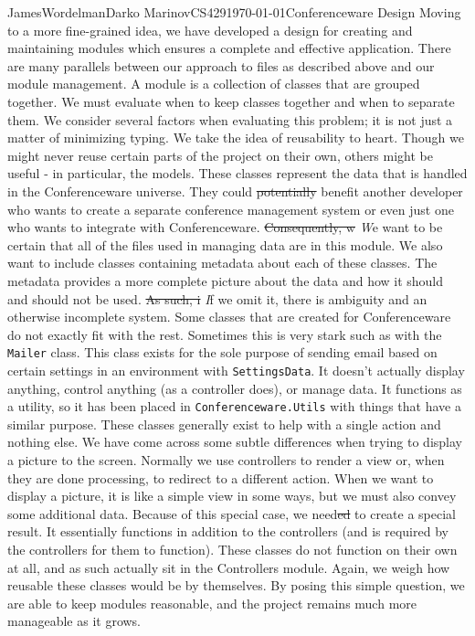 \documentclass[12pt,letterpaper]{article}
\begin{document}
\begin{mla}{James}{Wordelman}{Darko Marinov}{CS429}{\today}{Conferenceware
Design}
Moving to a more fine-grained idea, we have developed a design for creating and maintaining modules which ensures a complete and effective application. There are many parallels between our approach to files as described above and our module management. A module is a collection of classes that are grouped together. We must evaluate when to keep classes together and when to separate them.  We consider several factors when evaluating this problem; it is not just a matter of minimizing typing. We take the idea of reusability to heart. Though we might never reuse certain parts of the project on their own, others might be useful - in particular, the models. These classes represent the data that is handled in the Conferenceware universe. They could \sout{potentially} benefit another developer who wants to create a separate conference management system or even just one who wants to integrate with Conferenceware. \sout{Consequently, w} \textit{W}e want to be certain that all of the files used in managing data are in this module. We also want to include classes containing metadata about each of these classes. The metadata provides a more complete picture about the data and how it should and should not be used. \sout{As such, i} \textit{I}f we omit it, there is ambiguity and an otherwise incomplete system. Some classes that are created for Conferenceware do not exactly fit with the rest. Sometimes this is very stark such as with the \texttt{Mailer} class. This class exists for the sole purpose of sending email based on certain settings in an environment with \texttt{SettingsData}. It doesn't actually display anything, control anything (as a controller does), or manage data. It functions as a utility, so it has been placed in \texttt{Conferenceware.Utils} with things that have a similar purpose. These classes generally exist to help with a single action and nothing else. We have come across some subtle differences when trying to display a picture to the screen. Normally we use controllers to render a view or, when they are done processing, to redirect to a different action. When we want to display a picture, it is like a simple view in some ways, but we must also convey some additional data. Because of this special case, we need\sout{ed} to create a special result. It essentially functions in addition to the controllers (and is required by the controllers for them to function). These classes do not function on their own at all, and as such actually sit in the Controllers module. Again, we weigh how reusable these classes would be by themselves. By posing this simple question, we are able to keep modules reasonable, and the project remains much more manageable as it grows.


\end{mla}
\end{document}
